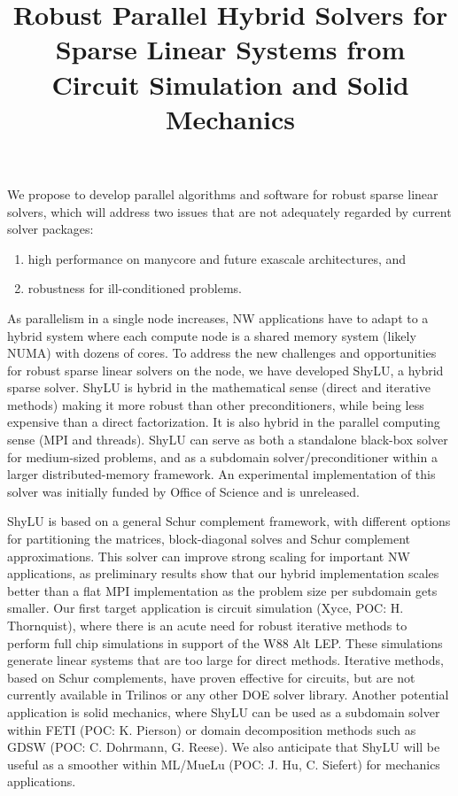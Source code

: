 \documentclass[10pt]{amsart}
\date{}
\title{Robust Parallel Hybrid Solvers for Sparse Linear Systems
from Circuit Simulation and Solid Mechanics}
\begin{document}
\maketitle

\vspace{-4mm}
We propose to develop parallel algorithms and software for robust sparse linear solvers,
which will address two issues that are not adequately regarded by current solver packages:
\begin{enumerate}
\item high performance on manycore and future exascale architectures, and
\item robustness for ill-conditioned problems.
\end{enumerate}

As parallelism in a single node increases, NW applications
have to adapt to a hybrid system where each compute node 
is a shared memory system (likely NUMA) with dozens of cores. 
To address the new challenges and opportunities 
for robust sparse linear solvers on the node,
we have developed ShyLU, a hybrid sparse solver. 
ShyLU is hybrid in the
mathematical sense (direct and iterative methods) making it more
robust than other preconditioners, while being less expensive
than a direct factorization.  It is also hybrid in the parallel
computing sense (MPI and threads).  ShyLU can serve as both
a standalone black-box solver for medium-sized problems,
and as a subdomain solver/preconditioner within a larger 
distributed-memory framework. 
An experimental implementation of
this solver was initially funded by Office of Science and is unreleased. 

ShyLU is based on a general Schur complement framework, with different options
for partitioning the matrices, block-diagonal solves and Schur complement
approximations.  This solver can improve strong scaling for important NW 
applications, as preliminary results show that our hybrid implementation scales better than
a flat MPI implementation as the problem size per subdomain gets smaller.
Our first target application is circuit simulation (Xyce, POC: H. Thornquist), 
where there is an acute need for robust iterative methods to perform full chip 
simulations in support of the W88 Alt LEP. These simulations generate linear systems that 
are too large for direct methods.
Iterative methods, based on Schur complements, have proven effective for circuits, but
are not currently available in Trilinos or any other DOE solver library.
%
Another potential application is solid mechanics, where ShyLU
can be used as a subdomain solver within FETI (POC: K. Pierson) or
domain decomposition methods such as GDSW (POC: C. Dohrmann, G. Reese). 
We also anticipate that ShyLU will be useful as a smoother within 
ML/MueLu (POC: J. Hu, C. Siefert) for mechanics applications.
%
\end{document}
